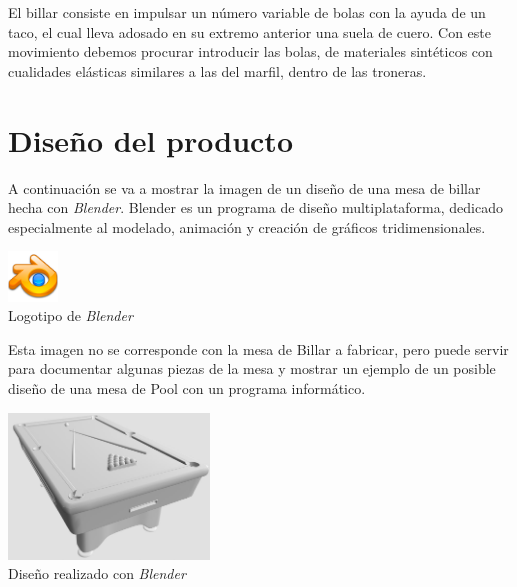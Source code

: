 El billar consiste en impulsar un número variable de bolas con la ayuda de un taco, el cual lleva adosado en su extremo anterior una suela de cuero.
Con este movimiento debemos procurar introducir las bolas, de materiales sintéticos con cualidades elásticas similares a las del marfil, dentro de las troneras.
   
\section {Diseño del producto}
A continuación se va a mostrar la imagen de un diseño de una mesa de billar hecha con \emph{Blender}. Blender es un programa de diseño  multiplataforma, dedicado especialmente al modelado, animación y creación de gráficos tridimensionales.

  \begin{center}
 \includegraphics[width=0.10\textwidth]{crystal_clear_app_blender.png} 
\\ \small {Logotipo de \emph{Blender}}
\end{center}

Esta imagen no se corresponde con la mesa de Billar a fabricar, pero puede servir para documentar algunas piezas de la mesa
y mostrar un ejemplo de un posible diseño de una mesa de Pool con un programa informático.

  \begin{center}


    			\includegraphics[width=0.40\textwidth]{prueba_billar.jpg} 
			\\ \small {Diseño realizado con \emph{Blender}}
		\end{center}

